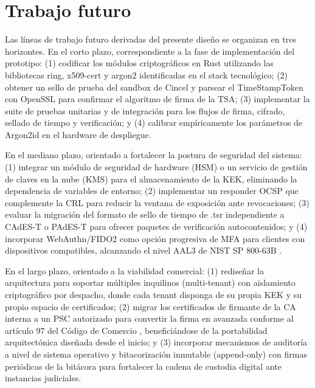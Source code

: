 \section{Trabajo futuro}\label{sec:trabajo-futuro}

Las líneas de trabajo futuro derivadas del presente diseño se organizan en tres horizontes. En el corto plazo, correspondiente a la fase de implementación del prototipo: (1) codificar los módulos criptográficos en Rust utilizando las bibliotecas ring, x509-cert y argon2 identificadas en el stack tecnológico; (2) obtener un sello de prueba del sandbox de Cincel y parsear el TimeStampToken con OpenSSL para confirmar el algoritmo de firma de la TSA; (3) implementar la suite de pruebas unitarias y de integración para los flujos de firma, cifrado, sellado de tiempo y verificación; y (4) calibrar empíricamente los parámetros de Argon2id en el hardware de despliegue.

En el mediano plazo, orientado a fortalecer la postura de seguridad del sistema: (1) integrar un módulo de seguridad de hardware (HSM) o un servicio de gestión de claves en la nube (KMS) para el almacenamiento de la KEK, eliminando la dependencia de variables de entorno; (2) implementar un responder OCSP que complemente la CRL para reducir la ventana de exposición ante revocaciones; (3) evaluar la migración del formato de sello de tiempo de .tsr independiente a CAdES-T o PAdES-T para ofrecer paquetes de verificación autocontenidos; y (4) incorporar WebAuthn/FIDO2 como opción progresiva de MFA para clientes con dispositivos compatibles, alcanzando el nivel AAL3 de NIST SP 800-63B \cite{nist2024}.

En el largo plazo, orientado a la viabilidad comercial: (1) rediseñar la arquitectura para soportar múltiples inquilinos (multi-tenant) con aislamiento criptográfico por despacho, donde cada tenant disponga de su propia KEK y su propio espacio de certificados; (2) migrar los certificados de firmante de la CA interna a un PSC autorizado para convertir la firma en avanzada conforme al artículo 97 del Código de Comercio \cite{ccom2018}, beneficiándose de la portabilidad arquitectónica diseñada desde el inicio; y (3) incorporar mecanismos de auditoría a nivel de sistema operativo y bitacorización inmutable (append-only) con firmas periódicas de la bitácora para fortalecer la cadena de custodia digital ante instancias judiciales.
